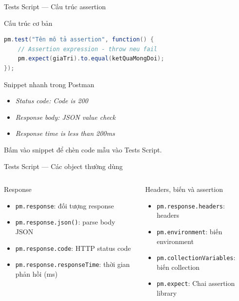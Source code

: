 \documentclass[aspectratio=169,10pt]{beamer}
\begin{document}
\begin{frame}[fragile]{Tests Script --- Cấu trúc assertion}
  \begin{block}{Cấu trúc cơ bản}
\begin{lstlisting}[language=Java,style=nonumber]
pm.test("Tên mô tả assertion", function() {
    // Assertion expression - throw neu fail
    pm.expect(giaTri).to.equal(ketQuaMongDoi);
});
\end{lstlisting}
  \end{block}

  \begin{block}{Snippet nhanh trong Postman}
    \begin{itemize}
      \item \textit{Status code: Code is 200}
      \item \textit{Response body: JSON value check}
      \item \textit{Response time is less than 200ms}
    \end{itemize}
    Bấm vào snippet để chèn code mẫu vào Tests Script.
  \end{block}
\end{frame}

\begin{frame}{Tests Script --- Các object thường dùng}
  \begin{columns}[T]
    \begin{block}{Response}
      \begin{itemize}
        \item \texttt{pm.response}: đối tượng response
        \item \texttt{pm.response.json()}: parse body JSON
        \item \texttt{pm.response.code}: HTTP status code
        \item \texttt{pm.response.responseTime}: thời gian phản hồi (ms)
      \end{itemize}
    \end{block}

    \begin{block}{Headers, biến và assertion}
      \begin{itemize}
        \item \texttt{pm.response.headers}: headers
        \item \texttt{pm.environment}: biến environment
        \item \texttt{pm.collectionVariables}: biến collection
        \item \texttt{pm.expect}: Chai assertion library
      \end{itemize}
    \end{block}
  \end{columns}
\end{frame}
\end{document}
